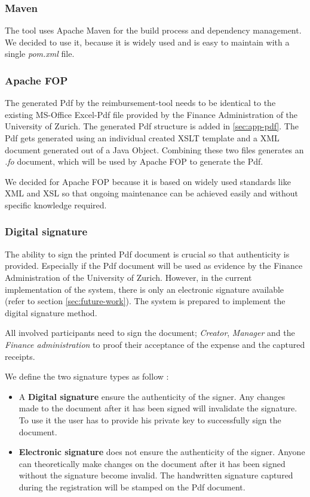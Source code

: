 \subsubsection{Maven}
The tool uses Apache Maven \cite{maven} for the build process and dependency management. We decided to use it, because it is widely used and is easy to maintain with a single \textit{pom.xml} file.

\subsubsection{Apache FOP}
The generated Pdf by the reimbursement-tool needs to be identical to the existing MS-Office Excel-Pdf file provided by the Finance Administration of the University of Zurich. The generated Pdf structure is added in \ref{sec:app-pdf}.\newline
The Pdf gets generated using an individual created XSLT template and a XML document generated out of a Java Object. Combining these two files generates an \textit{.fo} document, which will be used by Apache FOP \cite{apache-fop} to generate the Pdf.\par
We decided for Apache FOP because it is based on widely used standards like XML and XSL so that ongoing maintenance can be achieved easily and without specific knowledge required.

\subsubsection{Digital signature}
The ability to sign the printed Pdf document is crucial so that authenticity is provided. Especially if the Pdf document will be used as evidence by the Finance Administration of the University of Zurich. However, in the current implementation of the system, there is only an electronic signature available (refer to section \ref{sec:future-work}). The system is prepared to implement the digital signature method. \par

All involved participants need to sign the document; \textit{Creator}, \textit{Manager} and the \textit{Finance administration} to proof their acceptance of the expense and the captured receipts. \par

We define the two signature types as follow \cite{arx-signature}:
\begin{itemize}
    \item A \textbf{Digital signature} ensure the authenticity of the signer. Any changes made to the document after it has been signed will invalidate the signature. To use it the user has to provide his private key to successfully sign the document.
    \item \textbf{Electronic signature} does not ensure the authenticity of the signer. Anyone can theoretically make changes on the document after it has been signed without the signature become invalid. The handwritten signature captured during the registration will be stamped on the Pdf document.
\end{itemize}

